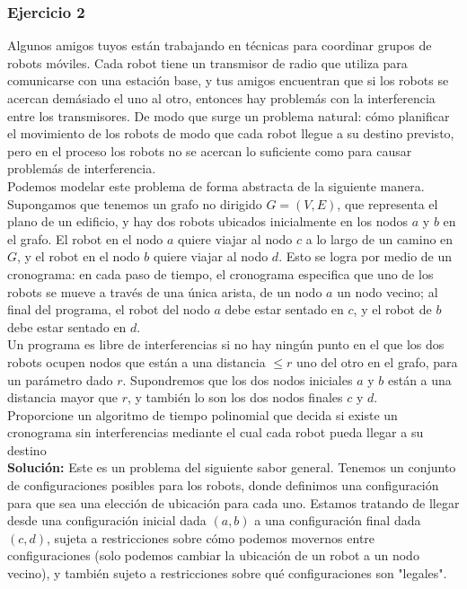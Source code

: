 \documentclass[a4paper]{article}
\begin{document}
\subsubsection*{Ejercicio 2}

Algunos amigos tuyos están trabajando en técnicas para coordinar grupos de robots móviles. Cada robot tiene un transmisor de radio que utiliza para comunicarse con una estación base, y tus amigos encuentran que si los robots se acercan demásiado el uno al otro, entonces hay problemás con la interferencia entre los transmisores. De modo que surge un problema natural: cómo planificar el movimiento de los robots de modo que cada robot llegue a su destino previsto, pero en el proceso los robots no se acercan lo suficiente como para causar problemás de interferencia.\\

Podemos modelar este problema de forma abstracta de la siguiente manera. Supongamos que tenemos un grafo no dirigido $G =(V, E)$, que representa el plano de un edificio, y hay dos robots ubicados inicialmente en los nodos $a$ y $b$ en el grafo. El robot en el nodo $a$ quiere viajar al nodo $c$ a lo largo de un camino en $G$, y el robot en el nodo $b$ quiere viajar al nodo $d$. Esto se logra por medio de un cronograma: en cada paso de tiempo, el cronograma especifica que uno de los robots se mueve a través de una única arista, de un nodo $a$ un nodo vecino; al final del programa, el robot del nodo $a$ debe estar sentado en $c$, y el robot de $b$ debe estar sentado en $d$.\\

Un programa es libre de interferencias si no hay ningún punto en el que los dos robots ocupen nodos que están a una distancia $≤ r$ uno del otro en el grafo, para un parámetro dado $r$. Supondremos que los dos nodos iniciales $a$ y $b$ están a una distancia mayor que $r$, y también lo son los dos nodos finales $c$ y $d$.\\

Proporcione un algoritmo de tiempo polinomial que decida si existe un cronograma sin interferencias mediante el cual cada robot pueda llegar a su destino\\

\textbf{Solución:} Este es un problema del siguiente sabor general. Tenemos un conjunto de configuraciones posibles para los robots, donde definimos una configuración para que sea una elección de ubicación para cada uno. Estamos tratando de llegar desde una configuración inicial dada $(a,b)$ a una configuración final dada $(c,d)$, sujeta a restricciones sobre cómo podemos movernos entre configuraciones (solo podemos cambiar la ubicación de un robot a un nodo vecino), y también sujeto a restricciones sobre qué configuraciones son "legales".\\
\end{document}
